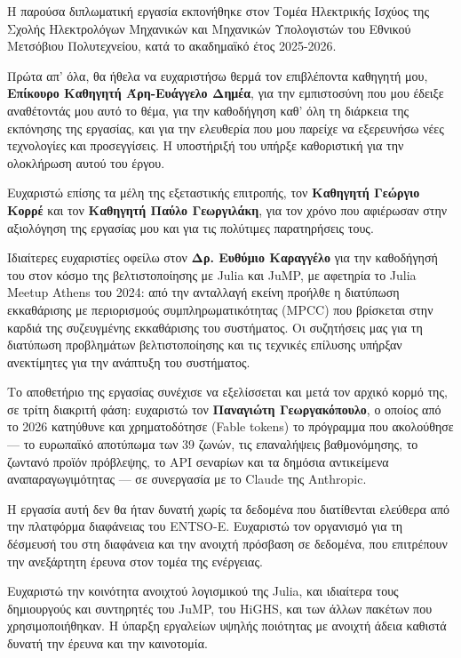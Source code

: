 \documentclass[diploma]{softlab-thesis}
\begin{document}

\begin{acknowledgementsgr}
Η παρούσα διπλωματική εργασία εκπονήθηκε στον Τομέα Ηλεκτρικής Ισχύος της Σχολής Ηλεκτρολόγων Μηχανικών και Μηχανικών Υπολογιστών του Εθνικού Μετσόβιου Πολυτεχνείου, κατά το ακαδημαϊκό έτος 2025-2026.

Πρώτα απ' όλα, θα ήθελα να ευχαριστήσω θερμά τον επιβλέποντα καθηγητή μου, \textbf{Επίκουρο Καθηγητή Άρη-Ευάγγελο Δημέα}, για την εμπιστοσύνη που μου έδειξε αναθέτοντάς μου αυτό το θέμα, για την καθοδήγηση καθ' όλη τη διάρκεια της εκπόνησης της εργασίας, και για την ελευθερία που μου παρείχε να εξερευνήσω νέες τεχνολογίες και προσεγγίσεις. Η υποστήριξή του υπήρξε καθοριστική για την ολοκλήρωση αυτού του έργου.

Ευχαριστώ επίσης τα μέλη της εξεταστικής επιτροπής, τον \textbf{Καθηγητή Γεώργιο Κορρέ} και τον \textbf{Καθηγητή Παύλο Γεωργιλάκη}, για τον χρόνο που αφιέρωσαν στην αξιολόγηση της εργασίας μου και για τις πολύτιμες παρατηρήσεις τους.

Ιδιαίτερες ευχαριστίες οφείλω στον \textbf{Δρ. Ευθύμιο Καραγγέλο} για την καθοδήγησή του στον κόσμο της βελτιστοποίησης με Julia και JuMP, με αφετηρία το Julia Meetup Athens του 2024: από την ανταλλαγή εκείνη προήλθε η διατύπωση εκκαθάρισης με περιορισμούς συμπληρωματικότητας (MPCC) που βρίσκεται στην καρδιά της συζευγμένης εκκαθάρισης του συστήματος. Οι συζητήσεις μας για τη διατύπωση προβλημάτων βελτιστοποίησης και τις τεχνικές επίλυσης υπήρξαν ανεκτίμητες για την ανάπτυξη του συστήματος.

Το αποθετήριο της εργασίας συνέχισε να εξελίσσεται και μετά τον αρχικό κορμό της, σε τρίτη διακριτή φάση: ευχαριστώ τον \textbf{Παναγιώτη Γεωργακόπουλο}, ο οποίος από το 2026 κατηύθυνε και χρηματοδότησε (Fable tokens) το πρόγραμμα που ακολούθησε --- το ευρωπαϊκό αποτύπωμα των 39 ζωνών, τις επαναλήψεις βαθμονόμησης, το ζωντανό προϊόν πρόβλεψης, το API σεναρίων και τα δημόσια αντικείμενα αναπαραγωγιμότητας --- σε συνεργασία με το Claude της Anthropic.

Η εργασία αυτή δεν θα ήταν δυνατή χωρίς τα δεδομένα που διατίθενται ελεύθερα από την πλατφόρμα διαφάνειας του ENTSO-E. Ευχαριστώ τον οργανισμό για τη δέσμευσή του στη διαφάνεια και την ανοιχτή πρόσβαση σε δεδομένα, που επιτρέπουν την ανεξάρτητη έρευνα στον τομέα της ενέργειας.

Ευχαριστώ την κοινότητα ανοιχτού λογισμικού της Julia, και ιδιαίτερα τους δημιουργούς και συντηρητές του JuMP, του HiGHS, και των άλλων πακέτων που χρησιμοποιήθηκαν. Η ύπαρξη εργαλείων υψηλής ποιότητας με ανοιχτή άδεια καθιστά δυνατή την έρευνα και την καινοτομία.


\end{acknowledgementsgr}
\end{document}
